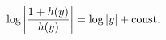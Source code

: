 \begin{equation}
  \label{eq:45}
  \log \left| \frac{1+h(y)}{h(y)} \right|
  = \log |y| + {\rm const}.
\end{equation}

